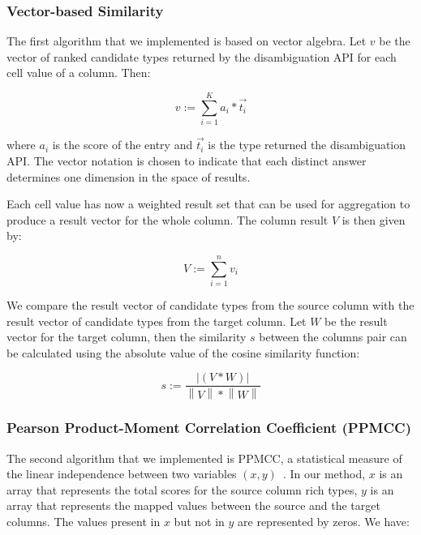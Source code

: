 \subsubsection{Vector-based Similarity}
The first algorithm that we implemented is based on vector algebra. Let $v$ be the vector of ranked candidate types returned by the disambiguation API for each cell value of a column. Then:

\begin{equation}\label{equation:equation_3}
v:=\sum^K_{i=1}{a_i}*\overrightarrow{t_i}
\end{equation}

where $a_i$ is the score of the entry and $\overrightarrow{t_i}$ is the type returned the disambiguation API. The vector notation is chosen to indicate that each distinct answer determines one dimension in the space of results.

Each cell value has now a weighted result set that can be used for aggregation to produce a result vector for the whole column. The column result $V$ is then given by:

\begin{equation}\label{equation:equation_4}
V:=\sum^n_{i=1}{v_i}
\end{equation}

We compare the result vector of candidate types from the source column with the result vector of candidate types from the target column. Let $W$ be the result vector for the target column, then the similarity $s$ between the columns pair can be calculated using the absolute value of the cosine similarity function:

\begin{equation}\label{equation:equation_5}
s:=\frac{\left|(V*W)\right|}{\left\|V\right\|*\left\|W\right\|}
\end{equation}


\subsubsection{Pearson Product-Moment Correlation Coefficient (PPMCC)}

The second algorithm that we implemented is PPMCC, a statistical measure of the linear independence between two variables $\left(x,y\right)$~\cite{Kowalski:RoyalStat:72}. In our method, $x$ is an array that represents the total scores for the source column rich types, $y$ is an array that represents the mapped values between the source and the target columns. The values present in $x$ but not in $y$ are represented by zeros. We have:


